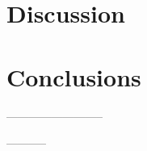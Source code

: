 \section{Discussion}



\section{Conclusions}
--------------------------




\begin{acks}

-----------
\end{acks}
